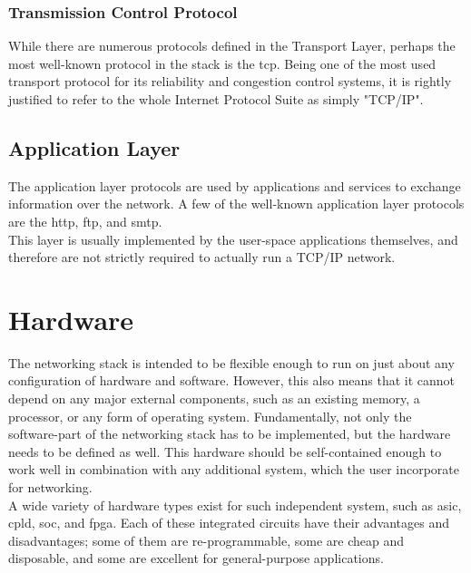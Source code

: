 \subsubsection{Transmission Control Protocol}
While there are numerous protocols defined in the Transport Layer, perhaps the
most well-known protocol in the stack is the \gls{tcp}.
Being one of the most used transport protocol for its reliability and congestion
control systems, it is rightly justified to refer to the whole Internet Protocol
Suite as simply "TCP/IP".\\



\subsection{Application Layer}
The application layer protocols are used by applications and services to
exchange information over the network. A few of the well-known application
layer protocols are the \gls{http}\cite{RFC1945},
\gls{ftp}\cite{RFC0114}, and \gls{smtp}\cite{RFC0788}.\\
This layer is usually implemented by the user-space applications themselves, and
therefore are not strictly required to actually run a TCP/IP network.



\section{Hardware}
The networking stack is intended to be flexible enough to run on just about any
configuration of hardware and software. However, this also means that it cannot
depend on any major external components, such as an existing memory, a processor,
or any form of operating system. Fundamentally, not only the software-part of the
networking stack has to be implemented, but the hardware needs to be defined
as well. This hardware should be self-contained enough to work well in combination
with any additional system, which the user incorporate for networking.\\
A wide variety of hardware types exist for such independent system, such as
\gls{asic}, \gls{cpld}, \gls{soc}, and \gls{fpga}.
Each of these integrated circuits have their advantages and disadvantages; some
of them are re-programmable, some are cheap and disposable, and some are excellent
for general-purpose applications.\\


